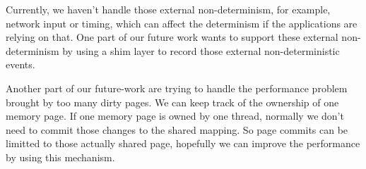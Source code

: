 \label{sec:future-work}

Currently, we haven't handle those external non-determinism, for example, network input or timing,
which can affect the determinism if the applications are relying on that. 
One part of our future work wants to support these external non-determinism by using a shim layer to record those
external non-deterministic events. 

Another part of our future-work are trying to handle the performance problem brought by too many dirty pages.
We can keep track of the ownership of one memory page. If one memory page is owned by one thread, normally
we don't need to commit those changes to the shared mapping. So page commits can be limitted to 
those actually shared page, hopefully we can improve the performance by using this mechanism.

